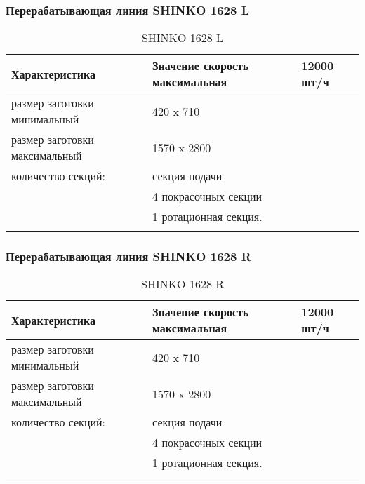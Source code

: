 \subsubsection{Перерабатывающая линия SHINKO   1628 L}
\begin{longtable}{|p{10cm}|p{5cm}|}
    \hline
	\textbf{Характеристика} & \textbf{Значение}
	\endhead
	\hline
 скорость максимальная       	 & 12000 шт/ч\\
  	\hline 
размер заготовки минимальный  	& 420 x 710   \\	
  	\hline 
  	размер заготовки максимальный   & 1570 x 2800  \\
  	\hline 
количество секций:    	& секция подачи\\
& 4 покрасочных секции \\
& 1 ротационная секция.\\
\hline 
  \caption{SHINKO   1628 L}\label{tab:line3}
\end{longtable}

\subsubsection{Перерабатывающая линия SHINKO   1628 R}
\begin{longtable}{|p{10cm}|p{5cm}|}
    \hline
	\textbf{Характеристика} & \textbf{Значение}
	\endhead
	\hline
 скорость максимальная       	 & 12000 шт/ч\\
  	\hline 
размер заготовки минимальный  	& 420 x 710   \\	
  	\hline 
  	размер заготовки максимальный   & 1570 x 2800  \\
  	\hline 
количество секций:    	& секция подачи\\
& 4 покрасочных секции \\
& 1 ротационная секция.\\
\hline 
  \caption{SHINKO   1628 R}\label{tab:line4}
\end{longtable}


